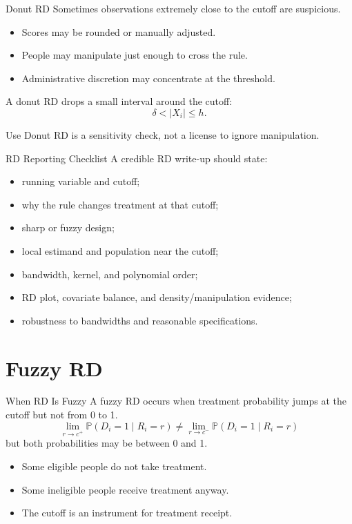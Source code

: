 \documentclass[11pt,aspectratio=169]{beamer}
\newcommand{\Prob}{\mathbb{P}}
\begin{document}
\begin{frame}{Donut RD}
  Sometimes observations extremely close to the cutoff are suspicious.
  \begin{itemize}
    \item Scores may be rounded or manually adjusted.
    \item People may manipulate just enough to cross the rule.
    \item Administrative discretion may concentrate at the threshold.
  \end{itemize}
  A donut RD drops a small interval around the cutoff:
  \[
    \delta < |X_i| \leq h.
  \]
  \begin{block}{Use}
    Donut RD is a sensitivity check, not a license to ignore manipulation.
  \end{block}
\end{frame}

\begin{frame}{RD Reporting Checklist}
  A credible RD write-up should state:
  \begin{itemize}
    \item running variable and cutoff;
    \item why the rule changes treatment at that cutoff;
    \item sharp or fuzzy design;
    \item local estimand and population near the cutoff;
    \item bandwidth, kernel, and polynomial order;
    \item RD plot, covariate balance, and density/manipulation evidence;
    \item robustness to bandwidths and reasonable specifications.
  \end{itemize}
\end{frame}

\section{Fuzzy RD}

\begin{frame}{When RD Is Fuzzy}
  A fuzzy RD occurs when treatment probability jumps at the cutoff but not from 0 to 1.
  \[
    \lim_{r\to c^+}\Prob(D_i=1\mid R_i=r)
    \neq
    \lim_{r\to c^-}\Prob(D_i=1\mid R_i=r)
  \]
  but both probabilities may be between 0 and 1.
  \begin{itemize}
    \item Some eligible people do not take treatment.
    \item Some ineligible people receive treatment anyway.
    \item The cutoff is an instrument for treatment receipt.
  \end{itemize}
\end{frame}
\end{document}
